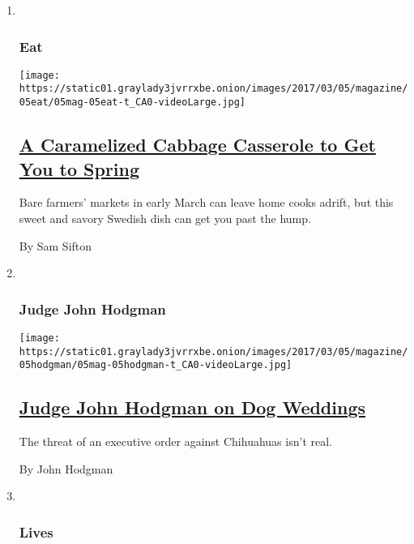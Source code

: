 \begin{enumerate}
\def\labelenumi{\arabic{enumi}.}
\item ~
  \hypertarget{eat}{%
  \subsubsection{Eat}\label{eat}}

  \texttt{[image: https://static01.graylady3jvrrxbe.onion/images/2017/03/05/magazine/05eat/05mag-05eat-t\_CA0-videoLarge.jpg]}

  \hypertarget{a-caramelized-cabbage-casserole-to-get-you-to-spring}{%
  \subsection{\texorpdfstring{\href{/2017/03/02/magazine/a-caramelized-cabbage-casserole-to-get-you-to-spring.html}{A
  Caramelized Cabbage Casserole to Get You to
  Spring}}{A Caramelized Cabbage Casserole to Get You to Spring}}\label{a-caramelized-cabbage-casserole-to-get-you-to-spring}}

  Bare farmers' markets in early March can leave home cooks adrift, but
  this sweet and savory Swedish dish can get you past the hump.

  By Sam Sifton
\item ~
  \hypertarget{judge-john-hodgman}{%
  \subsubsection{Judge John Hodgman}\label{judge-john-hodgman}}

  \texttt{[image: https://static01.graylady3jvrrxbe.onion/images/2017/03/05/magazine/05hodgman/05mag-05hodgman-t\_CA0-videoLarge.jpg]}

  \hypertarget{judge-john-hodgman-on-dog-weddings}{%
  \subsection{\texorpdfstring{\href{/2017/03/03/magazine/judge-john-hodgman-on-dog-weddings.html}{Judge
  John Hodgman on Dog
  Weddings}}{Judge John Hodgman on Dog Weddings}}\label{judge-john-hodgman-on-dog-weddings}}

  The threat of an executive order against Chihuahuas isn't real.

  By John Hodgman
\item ~
  \hypertarget{lives}{%
  \subsubsection{Lives}\label{lives}}


\end{enumerate}
